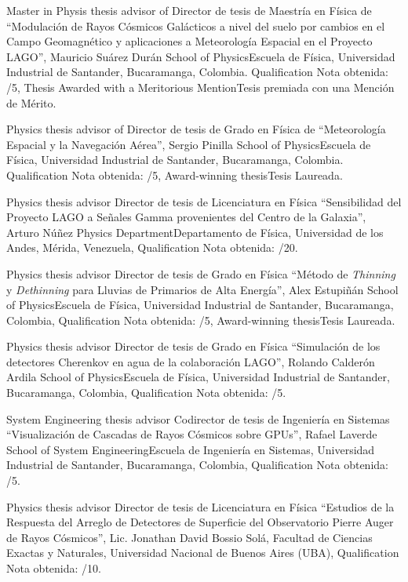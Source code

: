\ifeng
Master in Physis thesis advisor of
 \else
Director de tesis de Maestría en Física de
 \fi
``Modulación de Rayos Cósmicos Galácticos a nivel del suelo por cambios en el Campo Geomagnético y aplicaciones a Meteorología Espacial en el Proyecto LAGO'', Mauricio Suárez Durán \at \ifeng School of Physics\else Escuela de Física\fi, Universidad Industrial de Santander, Bucaramanga, Colombia. \ifeng Qualification \else Nota obtenida: /5, \ifeng Thesis Awarded with a Meritorious Mention\else Tesis premiada con una Mención de Mérito\fi.

\ifeng
Physics thesis advisor of
 \else
Director de tesis de Grado en Física de
 \fi
``Meteorología Espacial y la Navegación Aérea'', Sergio Pinilla \at \ifeng School of Physics\else Escuela de Física\fi, Universidad Industrial de Santander, Bucaramanga, Colombia.  \ifeng Qualification \else Nota obtenida: /5, \ifeng Award-winning thesis\else Tesis Laureada\fi.

\ifeng
Physics thesis advisor
 \else
Director de tesis de Licenciatura en Física
 \fi
``Sensibilidad del Proyecto LAGO a Señales Gamma provenientes del Centro de la Galaxia'', Arturo Núñez \at \ifeng Physics Department\else Departamento de Física\fi, Universidad de los Andes, Mérida, Venezuela, \ifeng Qualification \else Nota obtenida: /20.

\ifeng
Physics thesis advisor
 \else
Director de tesis de Grado en Física
 \fi
``Método de {\textit{Thinning}} y {\textit{Dethinning}} para Lluvias de Primarios de Alta Energía'', Alex Estupiñán \at \ifeng School of Physics\else Escuela de Física\fi, Universidad Industrial de Santander, Bucaramanga, Colombia, \ifeng Qualification \else Nota obtenida: /5, \ifeng Award-winning thesis\else Tesis Laureada\fi.

\ifeng
Physics thesis advisor
 \else
Director de tesis de Grado en Física
 \fi
``Simulación de los detectores Cherenkov en agua de la colaboración LAGO'', Rolando Calderón Ardila \at \ifeng School of Physics\else Escuela de Física\fi, Universidad Industrial de Santander, Bucaramanga, Colombia, \ifeng Qualification \else Nota obtenida: /5. 

\ifeng
System Engineering thesis advisor
 \else
Codirector de tesis de Ingeniería en Sistemas
 \fi
``Visualización de Cascadas de Rayos Cósmicos sobre GPUs'', Rafael Laverde \at \ifeng School of System Engineering\else Escuela de Ingeniería en Sistemas\fi, Universidad Industrial de Santander, Bucaramanga, Colombia, \ifeng Qualification \else Nota obtenida: /5.

\ifeng
Physics thesis advisor
 \else
Director de tesis de Licenciatura en Física
 \fi
``Estudios de la Respuesta del Arreglo de Detectores de Superficie del Observatorio Pierre Auger de Rayos Cósmicos'', Lic. Jonathan David Bossio Solá, \at Facultad de Ciencias Exactas y Naturales, Universidad Nacional de Buenos Aires (UBA), \ifeng Qualification \else Nota obtenida: /10.